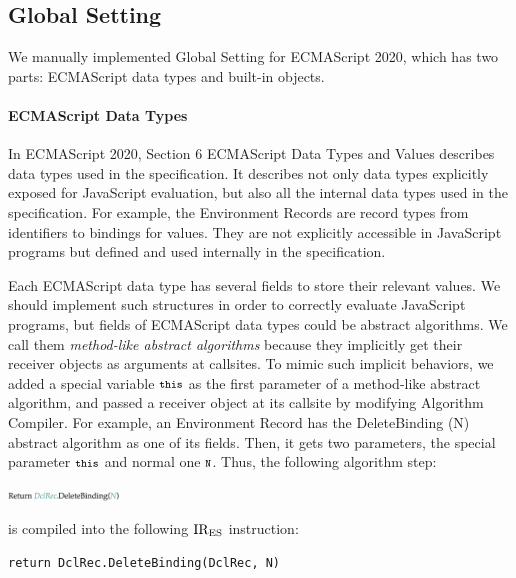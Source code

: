 \subsection{Global Setting}
We manually implemented \textsf{Global Setting} for ECMAScript 2020,
which has two parts: ECMAScript data types and built-in objects.

\paragraph{ECMAScript Data Types}
In ECMAScript 2020, Section 6 \textsf{ECMAScript Data Types and Values}
describes data types used in the specification.  It describes not only
data types explicitly exposed for JavaScript evaluation, but also all
the internal data types used in the specification.  For example, the
Environment Records are record types from identifiers to bindings for
values.  They are not explicitly accessible in JavaScript programs
but defined and used internally in the specification.

Each ECMAScript data type has several fields to store their relevant values.
We should implement such structures in order to correctly evaluate JavaScript
programs, but fields of ECMAScript data types could be abstract algorithms.
We call them \textit{method-like abstract algorithms} because they
implicitly get their receiver objects as arguments at callsites.
To mimic such implicit behaviors, we added a special variable
\( \texttt{\footnotesize this} \) as the first parameter of a method-like abstract algorithm,
and passed a receiver object at its callsite by modifying
\textsf{Algorithm Compiler}.  For example, an Environment Record has
the \textsf{DeleteBinding (N)} abstract algorithm as one of its fields.
Then, it gets two parameters, the special parameter \( \texttt{\footnotesize this} \)
and normal one \( \texttt{\footnotesize N} \).  Thus, the following algorithm step:
\begin{center}
  \includegraphics[width=0.22\textwidth]{img/method-like-example.png}
\end{center}
is compiled into the following \( \text{IR}_\text{ES} \) instruction:
\begin{lstlisting}[style=ires]
return DclRec.DeleteBinding(DclRec, N)
\end{lstlisting}

\vspace*{-.5em}
